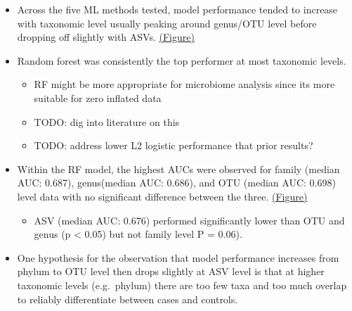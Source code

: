 \documentclass[
]{article}
\providecommand{\tightlist}{%
  \setlength{\itemsep}{0pt}\setlength{\parskip}{0pt}}
\begin{document}
\begin{itemize}
\tightlist
\item
  Across the five ML methods tested, model performance tended to
  increase with taxonomic level usually peaking around genus/OTU level
  before dropping off slightly with ASVs.
  \protect\hyperlink{model-performance-across-taxonomy}{(Figure)}
\item
  Random forest was consistently the top performer at most taxonomic
  levels.

  \begin{itemize}
  \tightlist
  \item
    RF might be more appropriate for microbiome analysis since its more
    suitable for zero inflated data
  \item
    TODO: dig into literature on this
  \item
    TODO: address lower L2 logistic performance that prior results?
  \end{itemize}
\item
  Within the RF model, the highest AUCs were observed for family (median
  AUC: 0.687), genus(median AUC: 0.686), and OTU (median AUC: 0.698)
  level data with no significant difference between the three.
  \protect\hyperlink{random-forest-model-performance-with-significance}{(Figure)}

  \begin{itemize}
  \tightlist
  \item
    ASV (median AUC: 0.676) performed significantly lower than OTU and
    genus (p \textless{} 0.05) but not family level P = 0.06).
  \end{itemize}
\item
  One hypothesis for the observation that model performance increases
  from phylum to OTU level then drops slightly at ASV level is that at
  higher taxonomic levels (e.g.~phylum) there are too few taxa and too
  much overlap to reliably differentiate between cases and controls.


\end{itemize}
\end{document}

